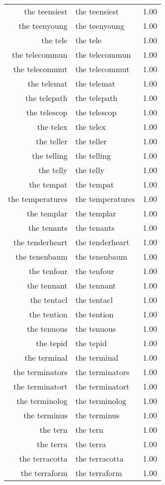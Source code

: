 \begin{table}[ht]
\begin{tabular}{rlr}
  the teensiest & the teensiest & 1.00 \\ 
  the teenyoung & the teenyoung & 1.00 \\ 
  the tele & the tele & 1.00 \\ 
  the telecommun & the telecommun & 1.00 \\ 
  the telecommut & the telecommut & 1.00 \\ 
  the telemat & the telemat & 1.00 \\ 
  the telepath & the telepath & 1.00 \\ 
  the telescop & the telescop & 1.00 \\ 
  the telex & the telex & 1.00 \\ 
  the teller & the teller & 1.00 \\ 
  the telling & the telling & 1.00 \\ 
  the telly & the telly & 1.00 \\ 
  the tempat & the tempat & 1.00 \\ 
  the temperatures & the temperatures & 1.00 \\ 
  the templar & the templar & 1.00 \\ 
  the tenants & the tenants & 1.00 \\ 
  the tenderheart & the tenderheart & 1.00 \\ 
  the tenenbaum & the tenenbaum & 1.00 \\ 
  the tenfour & the tenfour & 1.00 \\ 
  the tennant & the tennant & 1.00 \\ 
  the tentacl & the tentacl & 1.00 \\ 
  the tention & the tention & 1.00 \\ 
  the tenuous & the tenuous & 1.00 \\ 
  the tepid & the tepid & 1.00 \\ 
  the terminal & the terminal & 1.00 \\ 
  the terminators & the terminators & 1.00 \\ 
  the terminatort & the terminatort & 1.00 \\ 
  the terminolog & the terminolog & 1.00 \\ 
  the terminus & the terminus & 1.00 \\ 
  the tern & the tern & 1.00 \\ 
  the terra & the terra & 1.00 \\ 
  the terracotta & the terracotta & 1.00 \\ 
  the terraform & the terraform & 1.00 \\ 

\end{tabular}
\end{table}
